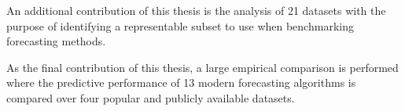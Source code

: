 An additional contribution of this thesis is the analysis of 21 datasets with the purpose of identifying a representable subset to use when benchmarking forecasting methods.

As the final contribution of this thesis, a large empirical comparison is performed where the predictive performance of 13 modern forecasting algorithms is compared over four popular and publicly available datasets.







